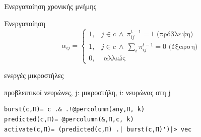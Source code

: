 \documentclass[10pt,lualatex]{beamer}
\begin{document}
\begin{frame}[fragile]{Ενεργοποίηση χρονικής μνήμης}
\begin{block}{Ενεργοποίηση}
  \begin{equation}
    α_{ij}= \begin{cases} 1, &j \in c \:\wedge\: π_{ij}^{t-1}=1 \text{ (πρόβλεψη)}\\
                          1, &j \in c \:\wedge\: \sum_i π_{ij}^{t-1}=0 \text{ (έξαρση)}\\
                          0, &\text{ αλλιώς}
            \end{cases}
  \end{equation}
  \begin{description}[fffff]
    \item[$c$] ενεργές μικροστήλες
    \item[$π_{ij}$] προβλεπτικοί νευρώνες, j: μικροστήλη, i: νευρώνας στη j
  \end{description}
\end{block}
\begin{verbatim}
burst(c,Π)= c .& .!@percolumn(any,Π, k)
predicted(c,Π)= @percolumn(&,Π,c, k)
activate(c,Π)= (predicted(c,Π) .| burst(c,Π)')|> vec
\end{verbatim}
\end{frame}
\end{document}
